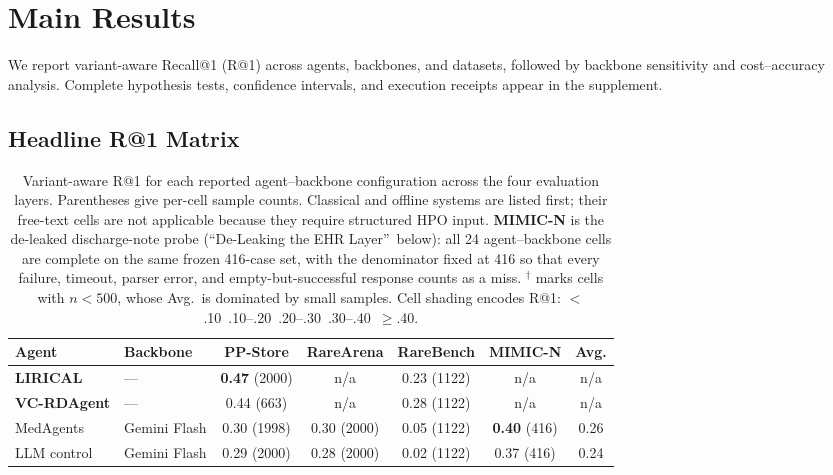 \documentclass[letterpaper]{article} %
\begin{document}
\section{Main Results}
\label{sec-6}

We report variant-aware Recall@1 (R@1) across agents, backbones, and datasets, followed by backbone sensitivity and cost--accuracy analysis. Complete hypothesis tests, confidence intervals, and execution receipts appear in the supplement.

\subsection{Headline R@1 Matrix}
\label{sec-6-1}

\begin{table}[t]
\centering
\scriptsize
\setlength{\tabcolsep}{2.2pt}
\caption{Variant-aware R@1 for each reported agent--backbone configuration across the four evaluation layers. Parentheses give per-cell sample counts. Classical and offline systems are listed first; their free-text cells are not applicable because they require structured HPO input. \textbf{MIMIC-N} is the de-leaked discharge-note probe (``De-Leaking the EHR Layer''\ below): all 24 agent--backbone cells are complete on the same frozen 416-case set, with the denominator fixed at 416 so that every failure, timeout, parser error, and empty-but-successful response counts as a miss. $^{\dagger}$ marks cells with $n<500$, whose Avg.\ is dominated by small samples. Cell shading encodes R@1: \colorbox{heatE}{$<$.10}~\colorbox{heatA}{.10--.20}~\colorbox{heatB}{.20--.30}~\colorbox{heatC}{.30--.40}~\colorbox{heatD}{$\geq$.40}.}
\label{tbl:main}
\begin{tabular}{@{}llccccc@{}}
\toprule
Agent & Backbone & PP-Store & RareArena & RareBench & MIMIC-N & Avg. \\
\midrule
\textbf{LIRICAL} & --- & \cellcolor{heatD}\textbf{0.47} (2000) & n/a & \cellcolor{heatB}0.23 (1122) & n/a & n/a \\
\textbf{VC-RDAgent} & --- & \cellcolor{heatD}0.44 (663) & n/a & \cellcolor{heatB}0.28 (1122) & n/a & n/a \\
\midrule
MedAgents  &  Gemini Flash  &  \cellcolor{heatC}0.30 (1998) & \cellcolor{heatC}0.30 (2000) & \cellcolor{heatE}0.05 (1122) & \cellcolor{heatD}\textbf{0.40} (416) & \cellcolor{heatB}0.26  \\
LLM control  &  Gemini Flash  &  \cellcolor{heatB}0.29 (2000) & \cellcolor{heatB}0.28 (2000) & \cellcolor{heatE}0.02 (1122) & \cellcolor{heatC}0.37 (416) & \cellcolor{heatB}0.24  \\

\end{tabular}
\end{table}
\end{document}
